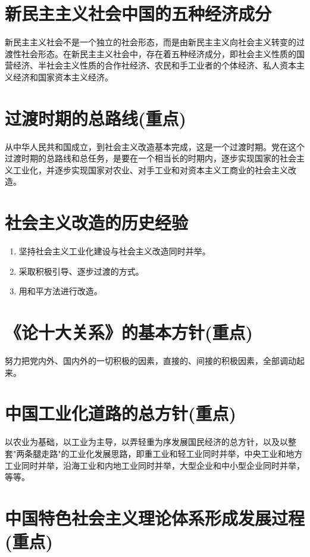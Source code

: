 \documentclass[12pt, a4paper, oneside]{ctexbook}
\begin{document}
\section{新民主主义社会中国的五种经济成分}

新民主主义社会不是一个独立的社会形态，而是由新民主主义向社会主义转变的过渡性社会形态。在新民主主义社会中，存在着五种经济成分，即社会主义性质的国营经济、半社会主义性质的合作社经济、农民和手工业者的个体经济、私人资本主义经济和国家资本主义经济。

\section{过渡时期的总路线(重点)}

从中华人民共和国成立，到社会主义改造基本完成，这是一个过渡时期。党在这个过渡时期的总路线和总任务，是要在一个相当长的时期内，逐步实现国家的社会主义工业化，并逐步实现国家对农业、对手工业和对资本主义工商业的社会主义改造。

\section{社会主义改造的历史经验}

\begin{enumerate}
\item 坚持社会主义工业化建设与社会主义改造同时并举。

\item 采取积极引导、逐步过渡的方式。

\item 用和平方法进行改造。
\end{enumerate}

\section{《论十大关系》的基本方针(重点)}

努力把党内外、国内外的一切积极的因素，直接的、间接的积极因素，全部调动起来。

\section{中国工业化道路的总方针(重点)}

以农业为基础，以工业为主导，以弄轻重为序发展国民经济的总方针，以及以整套"两条腿走路"的工业化发展思路，即重工业和轻工业同时并举，中央工业和地方工业同时并举，沿海工业和内地工业同时并举，大型企业和中小型企业同时并举，等等。

\section{中国特色社会主义理论体系形成发展过程(重点)}
\end{document}
